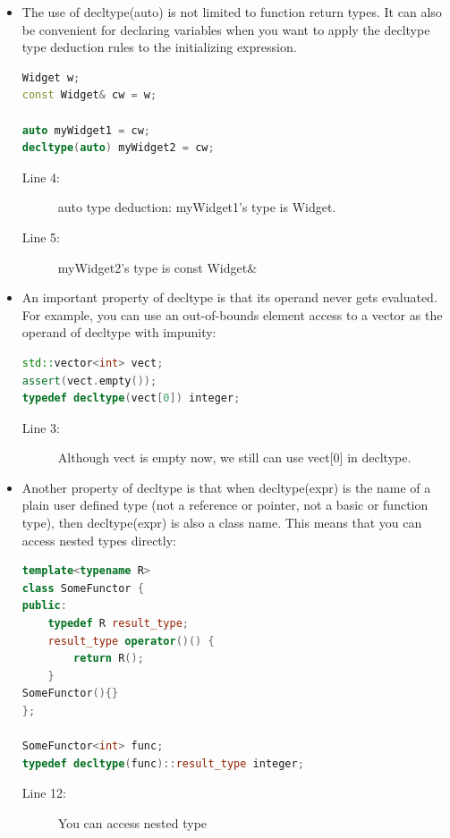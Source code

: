 \documentclass[a4paper,11pt,twoside]{book}
\begin{document}
\begin{itemize}
	\item The use of decltype(auto) is not limited to function return types. It can also be convenient for declaring variables when you want to apply the decltype type deduction rules to the initializing expression.
\begin{lstlisting}[frame=single, language=c++, mathescape=true]
Widget w;
const Widget& cw = w;

auto myWidget1 = cw; 
decltype(auto) myWidget2 = cw;
\end{lstlisting}
\begin{description}
	\item[Line 4:] auto type deduction: myWidget1's type is Widget.
	\item[Line 5:] myWidget2's type is  const Widget\&
\end{description}
	
	\item An important property of decltype is that its operand never gets evaluated. For example, you can use an out-of-bounds element access to a vector as the operand of decltype with impunity:
	
\begin{lstlisting}[frame=single, language=c++, mathescape=true]
std::vector<int> vect;
assert(vect.empty());
typedef decltype(vect[0]) integer; 

\end{lstlisting}
\begin{description}
	\item[Line 3:] Although vect is empty now, we still can use vect[0] in decltype.
\end{description}
	
	\item Another property of decltype is that when decltype(expr) is the name of a plain user defined type (not a reference or pointer, not a basic or function type), then decltype(expr) is also a class name. This means that you can access nested types directly:
\begin{lstlisting}[frame=single, language=c++, mathescape=true]
template<typename R>
class SomeFunctor {
public:
	typedef R result_type;
	result_type operator()() {
		return R();
	}
SomeFunctor(){}
};

SomeFunctor<int> func;
typedef decltype(func)::result_type integer; 
\end{lstlisting}
\begin{description}
	\item[Line 12:] You can access nested type
\end{description}
	

\end{itemize}
\end{document}
